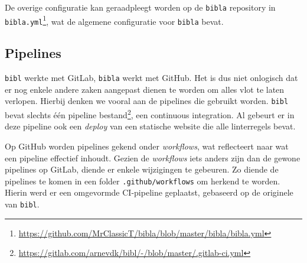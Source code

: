 De overige configuratie kan geraadpleegt worden op de \texttt{bibla} repository in \texttt{bibla.yml}\footnote{\url{https://github.com/MrClassicT/bibla/blob/master/bibla/bibla.yml}}, wat de algemene configuratie voor \texttt{bibla} bevat.

\subsection{Pipelines}
\texttt{bibl} werkte met GitLab, \texttt{bibla} werkt met GitHub. Het is dus niet onlogisch dat er nog enkele andere zaken aangepast dienen te worden om alles vlot te laten verlopen. Hierbij denken we vooral aan de pipelines die gebruikt worden. \texttt{bibl} bevat slechts één pipeline bestand\footnote{\url{https://gitlab.com/arnevdk/bibl/-/blob/master/.gitlab-ci.yml}}, een continuous integration. Al gebeurt er in deze pipeline ook een \emph{deploy} van een statische website die alle linterregels bevat.

Op GitHub worden pipelines gekend onder \emph{workflows}, wat reflecteert naar wat een pipeline effectief inhoudt. Gezien de \emph{workflows} iets anders zijn dan de gewone pipelines op GitLab, diende er enkele wijzigingen te gebeuren. Zo diende de pipelines te komen in een folder \texttt{.github/workflows} om herkend te worden. Hierin werd er een omgevormde CI-pipeline geplaatst, gebaseerd op de originele van \texttt{bibl}.


